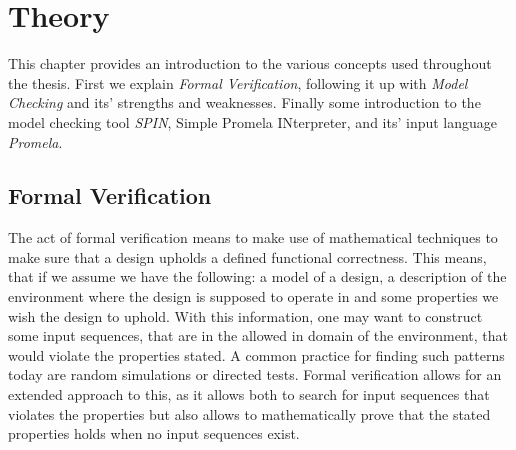 \chapter{Theory}


This chapter provides an introduction to the various concepts used throughout the thesis. First we explain \textit{Formal Verification}, following it up with \textit{Model Checking} and its' strengths and weaknesses. Finally some introduction to the model checking tool \textit{SPIN}, Simple Promela INterpreter, and its' input language \textit{Promela}.




\section{Formal Verification}

The act of formal verification means to make use of mathematical techniques to make sure that a design upholds a defined functional correctness\cite{bjesse2005formal}.
This means, that if we assume we have the following: a model of a design, a description of the environment where the design is supposed to operate in and some properties we wish the design to uphold. With this information, one may want to construct some input sequences, that are in the allowed in domain of the environment, that would violate the properties stated. A common practice for finding such patterns today are random simulations or directed tests.
Formal verification allows for an extended approach to this, as it allows both to search for input sequences that violates the properties but also allows to mathematically prove that the stated properties holds when no input sequences exist.

